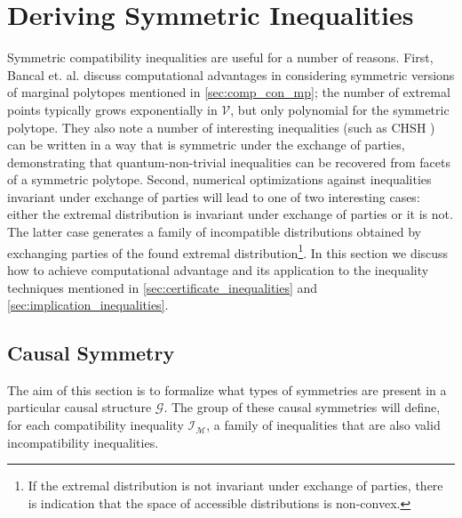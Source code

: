 \documentclass[aps, 10pt, english, twoside, pra, nofootinbib, longbibliography]{revtex4-1}
\theoremstyle{plain}
\theoremstyle{definition}
\theoremstyle{remark}
\newcommand{\graph}{\mathcal{G}}
\begin{document}
    \section{Deriving Symmetric Inequalities}
    Symmetric compatibility inequalities are useful for a number of reasons. First, Bancal et. al. \cite{Bancal_2010} discuss computational advantages in considering symmetric versions of marginal polytopes mentioned in \cref{sec:comp_con_mp}; the number of extremal points typically grows exponentially in $\mathcal{V}$, but only polynomial for the symmetric polytope. They also note a number of interesting inequalities (such as CHSH \cite{CHSH_Original}) can be written in a way that is symmetric under the exchange of parties, demonstrating that quantum-non-trivial inequalities can be recovered from facets of a symmetric polytope. Second, numerical optimizations against inequalities invariant under exchange of parties will lead to one of two interesting cases: either the extremal distribution is invariant under exchange of parties or it is not. The latter case generates a family of incompatible distributions obtained by exchanging parties of the found extremal distribution\footnote{If the extremal distribution is not invariant under exchange of parties, there is indication that the space of accessible distributions is non-convex.}. In this section we discuss how to achieve computational advantage and its application to the inequality techniques mentioned in \cref{sec:certificate_inequalities} and \cref{sec:implication_inequalities}.
    \subsection{Causal Symmetry}
    The aim of this section is to formalize what types of symmetries are present in a particular causal structure $\graph$. The group of these causal symmetries will define, for each compatibility inequality $\mathcal{I}_{\mathcal{M}}$, a family of inequalities that are also valid incompatibility inequalities.
\end{document}
